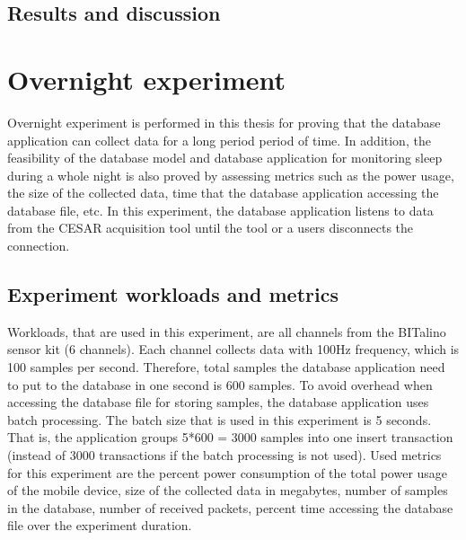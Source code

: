 \subsection{Results and discussion}


\section{Overnight experiment}
Overnight experiment is performed in this thesis for proving that the database application can collect data for a long period period of time. In addition, the feasibility of the database model and database application for monitoring sleep during a whole night is also proved by assessing metrics such as the power usage, the size of the collected data, time that the database application accessing the database file, etc. In this experiment, the database application listens to data from the CESAR acquisition tool until the tool or a users disconnects the connection.
\subsection{Experiment workloads and metrics}
Workloads, that are used in this experiment, are all channels from the BITalino sensor kit (6 channels). Each channel collects data with 100Hz frequency, which is 100 samples per second. Therefore, total samples the database application need to put to the database in one second is 600 samples. To avoid overhead when accessing the database file for storing samples, the database application uses batch processing. The batch size that is used in this experiment is 5 seconds. That is, the application groups 5*600 = 3000 samples into one insert transaction (instead of 3000 transactions if the batch processing is not used). Used metrics for this experiment are the percent power consumption of the total power usage of the mobile device, size of the collected data in megabytes, number of samples in the database, number of received packets, percent time accessing the database file over the experiment duration.
